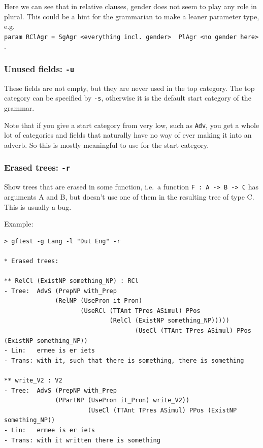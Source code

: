 Here we can see that in relative clauses, gender does not seem to play
any role in plural. This could be a hint for the grammarian to make a
leaner parameter type, e.g.
\texttt{param\ RClAgr\ =\ SgAgr\ \textless{}everything\ incl.\ gender\textgreater{}\ \textbar{}\ PlAgr\ \textless{}no\ gender\ here\textgreater{}}.

\hypertarget{unused-fields--u}{%
\subsubsection{\texorpdfstring{Unused fields:
\texttt{-u}}{Unused fields: -u}}\label{unused-fields--u}}

These fields are not empty, but they are never used in the top category.
The top category can be specified by \texttt{-s}, otherwise it is the
default start category of the grammar.

Note that if you give a start category from very low, such as
\texttt{Adv}, you get a whole lot of categories and fields that
naturally have no way of ever making it into an adverb. So this is
mostly meaningful to use for the start category.

\hypertarget{erased-trees--r}{%
\subsubsection{\texorpdfstring{Erased trees:
\texttt{-r}}{Erased trees: -r}}\label{erased-trees--r}}

Show trees that are erased in some function, i.e.~a function
\texttt{F\ :\ A\ -\textgreater{}\ B\ -\textgreater{}\ C} has arguments A
and B, but doesn't use one of them in the resulting tree of type C. This
is usually a bug.

Example:

\begin{verbatim}
> gftest -g Lang -l "Dut Eng" -r

* Erased trees:

** RelCl (ExistNP something_NP) : RCl
- Tree:  AdvS (PrepNP with_Prep
              (RelNP (UsePron it_Pron)
                     (UseRCl (TTAnt TPres ASimul) PPos
                             (RelCl (ExistNP something_NP)))))
                                    (UseCl (TTAnt TPres ASimul) PPos (ExistNP something_NP))
- Lin:   ermee is er iets
- Trans: with it, such that there is something, there is something

** write_V2 : V2
- Tree:  AdvS (PrepNP with_Prep
              (PPartNP (UsePron it_Pron) write_V2))
                       (UseCl (TTAnt TPres ASimul) PPos (ExistNP something_NP))
- Lin:   ermee is er iets
- Trans: with it written there is something
\end{verbatim}

